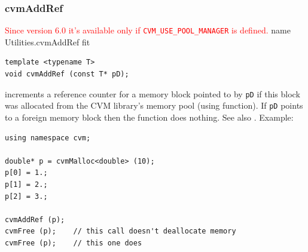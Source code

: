 \subsubsection{cvmAddRef}
\textcolor{red}{Since version 6.0 it's available only if \texttt{CVM\_USE\_POOL\_MANAGER} is defined.}%
\pdfdest name {Utilities.cvmAddRef} fit
\begin{verbatim}
template <typename T>
void cvmAddRef (const T* pD);
\end{verbatim}
increments a reference counter for a memory block pointed to
by \verb"pD" if this block was allocated from the CVM library's
memory pool (using  function).
If \verb"pD" points to a foreign memory block then
the function does nothing.
See also .
Example:
\begin{Verbatim}
using namespace cvm;

double* p = cvmMalloc<double> (10);
p[0] = 1.;
p[1] = 2.;
p[2] = 3.;

cvmAddRef (p);
cvmFree (p);    // this call doesn't deallocate memory
cvmFree (p);    // this one does
\end{Verbatim}
\newpage




